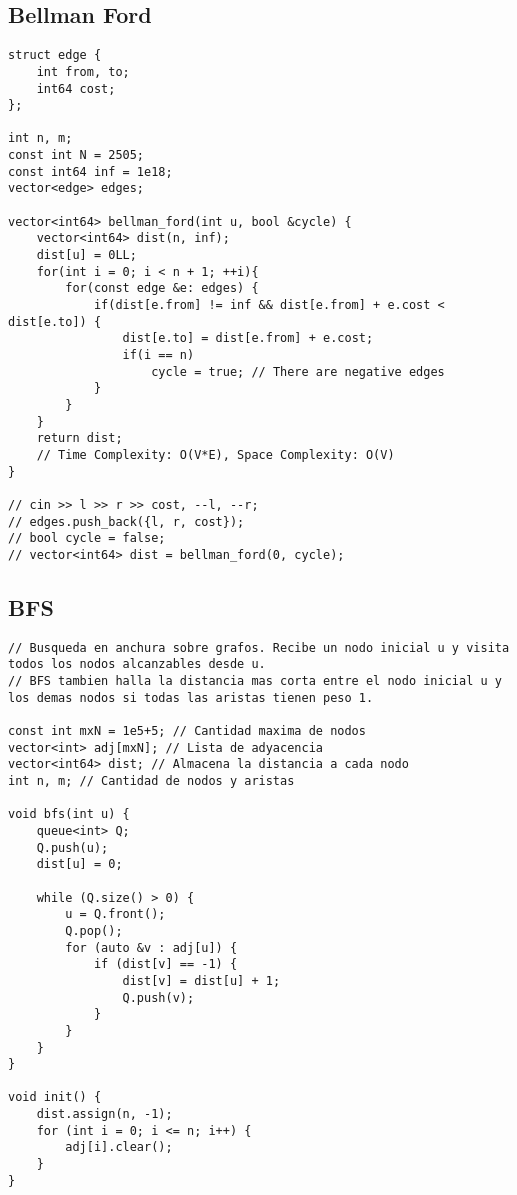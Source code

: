\documentclass[10pt,letterpaper,twocolumn,twosided]{article}
\begin{document}
\subsection{Bellman Ford}
\begin{lstlisting}
struct edge {
    int from, to;
    int64 cost;
};

int n, m;
const int N = 2505;
const int64 inf = 1e18;
vector<edge> edges;

vector<int64> bellman_ford(int u, bool &cycle) {
    vector<int64> dist(n, inf);
    dist[u] = 0LL;
    for(int i = 0; i < n + 1; ++i){
        for(const edge &e: edges) {
            if(dist[e.from] != inf && dist[e.from] + e.cost < dist[e.to]) {
                dist[e.to] = dist[e.from] + e.cost;
                if(i == n)
                    cycle = true; // There are negative edges
            }
        }
    }
    return dist;
    // Time Complexity: O(V*E), Space Complexity: O(V)
}

// cin >> l >> r >> cost, --l, --r;
// edges.push_back({l, r, cost});
// bool cycle = false;
// vector<int64> dist = bellman_ford(0, cycle);
\end{lstlisting}

\subsection{BFS}
\begin{lstlisting}
// Busqueda en anchura sobre grafos. Recibe un nodo inicial u y visita todos los nodos alcanzables desde u.
// BFS tambien halla la distancia mas corta entre el nodo inicial u y los demas nodos si todas las aristas tienen peso 1.

const int mxN = 1e5+5; // Cantidad maxima de nodos
vector<int> adj[mxN]; // Lista de adyacencia
vector<int64> dist; // Almacena la distancia a cada nodo
int n, m; // Cantidad de nodos y aristas

void bfs(int u) {
    queue<int> Q;
    Q.push(u);
    dist[u] = 0;

    while (Q.size() > 0) {
        u = Q.front();
        Q.pop();
        for (auto &v : adj[u]) {
            if (dist[v] == -1) {
                dist[v] = dist[u] + 1;
                Q.push(v);
            }
        }
    }
}

void init() {
    dist.assign(n, -1);
    for (int i = 0; i <= n; i++) {
        adj[i].clear();
    }
}
\end{lstlisting}
\end{document}

